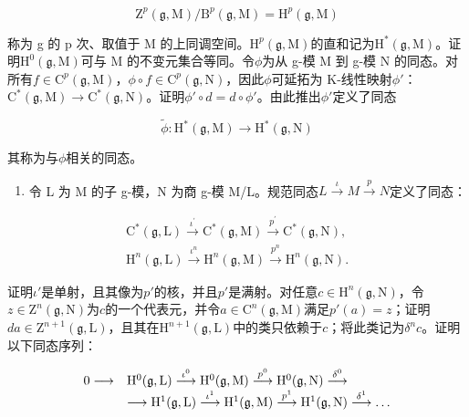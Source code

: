 \[
\mathrm{Z} ^ {p} (\mathfrak {g}, \mathrm{M}) / \mathrm{B} ^ {p} (\mathfrak {g}, \mathrm{M}) = \mathrm{H} ^ {p} (\mathfrak {g}, \mathrm{M})
\]

称为 g 的 p 次、取值于 M 的上同调空间。\(\mathrm{H}^{p}(\mathfrak{g},\mathrm{M})\)的直和记为\(\mathrm{H}^{*}(\mathfrak{g},\mathrm{M})\)。证明\(\mathrm{H}^{0}(\mathfrak{g},\mathrm{M})\)可与 M 的不变元集合等同。令\(\phi\)为从 g-模 M 到 g-模 N 的同态。对所有\(f \in \mathrm{C}^{p}(\mathfrak{g},\mathrm{M})\)，\(\phi \circ f \in \mathrm{C}^{p}(\mathfrak{g},\mathrm{N})\)，因此\(\phi\)可延拓为 K-线性映射\(\phi'\)：\(\mathrm{C}^{*}(\mathfrak{g},\mathrm{M}) \to \mathrm{C}^{*}(\mathfrak{g},\mathrm{N})\)。证明\(\phi' \circ d = d \circ \phi'\)。由此推出\(\phi'\)定义了同态

\[
\tilde {\phi} \colon \mathrm{H} ^ {*} (\mathfrak {g}, \mathrm{M}) \to \mathrm{H} ^ {*} (\mathfrak {g}, \mathrm{N})
\]

其称为与\(\phi\)相关的同态。

\begin{enumerate}
\def\labelenumi{(\alph{enumi})}
\setcounter{enumi}{5}
\tightlist
\item
  令 L 为 M 的子 g-模，N 为商 g-模 M/L。规范同态\(L \stackrel{\iota}{\rightarrow} M \stackrel{p}{\rightarrow} N\)定义了同态：
\end{enumerate}

\[
\begin{array}{l} \mathrm{C} ^ {*} (\mathfrak {g}, \mathrm{L}) \xrightarrow {\iota^ {\prime}} \mathrm{C} ^ {*} (\mathfrak {g}, \mathrm{M}) \xrightarrow {p ^ {\prime}} \mathrm{C} ^ {*} (\mathfrak {g}, \mathrm{N}), \\ \mathrm{H} ^ {n} (\mathfrak {g}, \mathrm{L}) \xrightarrow {\iota^ {n}} \mathrm{H} ^ {n} (\mathfrak {g}, \mathrm{M}) \xrightarrow {p ^ {n}} \mathrm{H} ^ {n} (\mathfrak {g}, \mathrm{N}). \end{array}
\]

证明\(\iota'\)是单射，且其像为\(p'\)的核，并且\(p'\)是满射。对任意\(c \in \mathrm{H}^n(\mathfrak{g},\mathrm{N})\)，令\(z \in \mathrm{Z}^n(\mathfrak{g},\mathrm{N})\)为\(c\)的一个代表元，并令\(a \in \mathrm{C}^n(\mathfrak{g},\mathrm{M})\)满足\(p'(a) = z\)；证明\(da \in \mathrm{Z}^{n+1}(\mathfrak{g},\mathrm{L})\)，且其在\(\mathrm{H}^{n+1}(\mathfrak{g},\mathrm{L})\)中的类只依赖于\(c\)；将此类记为\(\delta^n c\)。证明以下同态序列：

\[
\begin{array}{r l} 0 \longrightarrow & \mathrm{H} ^ {0} (\mathfrak {g}, \mathrm{L}) \stackrel {{\iota ^ {0}}} {{\longrightarrow}} \mathrm{H} ^ {0} (\mathfrak {g}, \mathrm{M}) \stackrel {{p ^ {0}}} {{\longrightarrow}} \mathrm{H} ^ {0} (\mathfrak {g}, \mathrm{N}) \stackrel {{\delta^ {0}}} {{\longrightarrow}} \\ & \longrightarrow \mathrm{H} ^ {1} (\mathfrak {g}, \mathrm{L}) \stackrel {{\iota ^ {1}}} {{\longrightarrow}} \mathrm{H} ^ {1} (\mathfrak {g}, \mathrm{M}) \stackrel {{p ^ {1}}} {{\longrightarrow}} \mathrm{H} ^ {1} (\mathfrak {g}, \mathrm{N}) \stackrel {{\delta^ {1}}} {{\longrightarrow}} \dots \end{array}
\]

